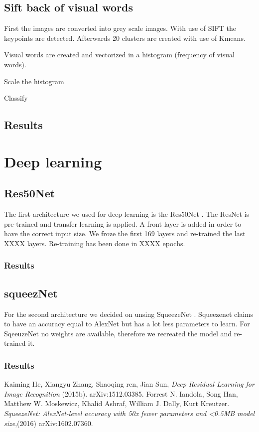 \documentclass[11pt]{article}
\begin{document}
\subsection{Sift back of visual words}
First the images are converted into grey scale images. With use of SIFT the keypoints are detected. Afterwards 20 clusters are created with use of Kmeans.

Visual words are created and vectorized in a histogram (frequency of visual words). 

Scale the histogram 

Classify


\subsection{Results}

\section{Deep learning}


\subsection{Res50Net}
The first architecture we used for deep learning is the Res50Net \cite{Resnet}. The ResNet is pre-trained and transfer learning is applied. A front layer is added in order to have the correct input size. We froze the first 169 layers and re-trained the last XXXX layers. Re-training has been done in XXXX epochs.

\subsubsection{Results}

  


\subsection{squeezNet}
For the second architecture we decided on unsing SqueezeNet \cite{Sqeezenet}. Squeezenet claims to have an accuracy equal to AlexNet but has a lot less parameters to learn.  
For SqeeuzeNet no weights are available, therefore we recreated the model and re-trained it. 



\subsubsection{Results}



\begin{thebibliography}{10}
	
Kaiming He, Xiangyu Zhang, Shaoqing ren, Jian Sun, \textit{Deep Residual Learning for Image Recognition}  
 (2015b). arXiv:1512.03385.
Forrest N. Iandola, Song Han, Matthew W. Moskewicz, Khalid Ashraf, William J. Dally, Kurt Kreutzer. \textit{SqueezeNet: AlexNet-level accuracy with 50x fewer parameters and <0.5MB model size},(2016) arXiv:1602.07360.
\end{thebibliography}
\end{document}
